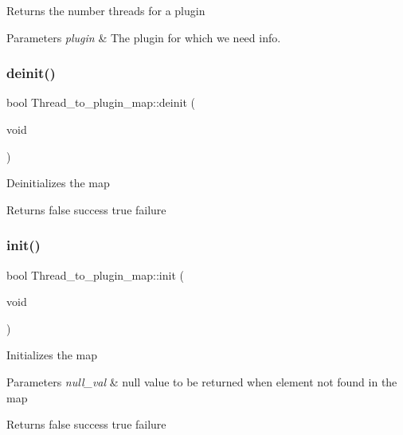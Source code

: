 Returns the number threads for a plugin


\begin{DoxyParams}{Parameters}
{\em plugin} & The plugin for which we need info. \\
\hline
\end{DoxyParams}
\mbox{\label{classThread__to__plugin__map_a4cea7a05e63e700584bf305dc28aaa2c}} 
\subsubsection{\texorpdfstring{deinit()}{deinit()}}
{\footnotesize\ttfamily bool Thread\+\_\+to\+\_\+plugin\+\_\+map\+::deinit (\begin{DoxyParamCaption}\item[{void}]{ }\end{DoxyParamCaption})\hspace{0.3cm}{\ttfamily [inline]}}

Deinitializes the map

\begin{DoxyReturn}{Returns}
false success true failure 
\end{DoxyReturn}
\mbox{\label{classThread__to__plugin__map_ad5ad833c4c25b30f299108c5a10da632}} 
\subsubsection{\texorpdfstring{init()}{init()}}
{\footnotesize\ttfamily bool Thread\+\_\+to\+\_\+plugin\+\_\+map\+::init (\begin{DoxyParamCaption}\item[{void}]{ }\end{DoxyParamCaption})\hspace{0.3cm}{\ttfamily [inline]}}

Initializes the map


\begin{DoxyParams}{Parameters}
{\em null\+\_\+val} & null value to be returned when element not found in the map\\
\hline
\end{DoxyParams}
\begin{DoxyReturn}{Returns}
false success true failure 
\end{DoxyReturn}
\mbox{\label{classThread__to__plugin__map_a90bd103e25c4a006a672f64dbaa08c2c}} 

